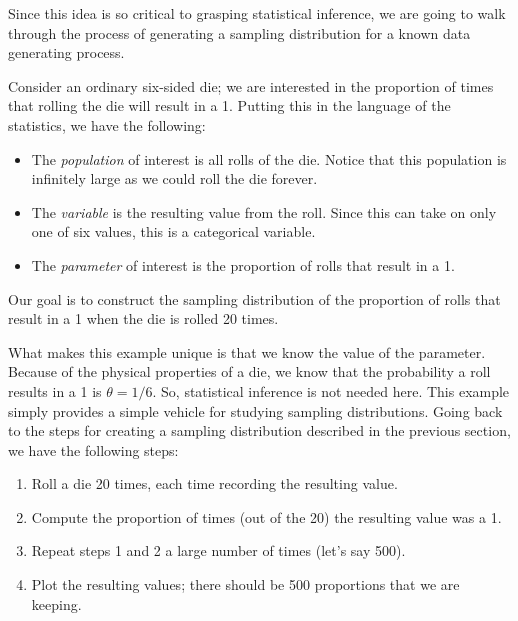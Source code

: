 \documentclass[]{book}
\providecommand{\tightlist}{%
  \setlength{\itemsep}{0pt}\setlength{\parskip}{0pt}}
\theoremstyle{definition}
\theoremstyle{definition}
\theoremstyle{remark}
\let\BeginKnitrBlock\begin \let\EndKnitrBlock\end
\begin{document}
Since this idea is so critical to grasping statistical inference, we are
going to walk through the process of generating a sampling distribution
for a known data generating process.

\BeginKnitrBlock{example}[Dice Experiment]
\protect\hypertarget{ex:samplingdistns-dice}{}{\label{ex:samplingdistns-dice}
{} }Consider an ordinary six-sided die; we
are interested in the proportion of times that rolling the die will
result in a 1. Putting this in the language of the statistics, we have
the following:

\begin{itemize}
\tightlist
\item
  The \emph{population} of interest is all rolls of the die. Notice that
  this population is infinitely large as we could roll the die forever.
\item
  The \emph{variable} is the resulting value from the roll. Since this
  can take on only one of six values, this is a categorical variable.
\item
  The \emph{parameter} of interest is the proportion of rolls that
  result in a 1.
\end{itemize}

Our goal is to construct the sampling distribution of the proportion of
rolls that result in a 1 when the die is rolled 20 times.
\EndKnitrBlock{example}

What makes this example unique is that we know the value of the
parameter. Because of the physical properties of a die, we know that the
probability a roll results in a 1 is \(\theta = 1/6\). So, statistical
inference is not needed here. This example simply provides a simple
vehicle for studying sampling distributions. Going back to the steps for
creating a sampling distribution described in the previous section, we
have the following steps:

\begin{enumerate}
\def\labelenumi{\arabic{enumi}.}
\tightlist
\item
  Roll a die 20 times, each time recording the resulting value.
\item
  Compute the proportion of times (out of the 20) the resulting value
  was a 1.
\item
  Repeat steps 1 and 2 a large number of times (let's say 500).
\item
  Plot the resulting values; there should be 500 proportions that we are
  keeping.
\end{enumerate}
\end{document}
